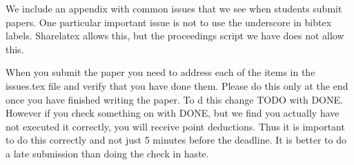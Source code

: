 
 

\appendix

We include an appendix with common issues that we see when students
submit papers. One particular important issue is not to use the
underscore in bibtex labels. Sharelatex allows this, but the
proceedings script we have does not allow this.

When you submit the paper you need to address each of the items in the
issues.tex file and verify that you have done them. Please do this
only at the end once you have finished writing the paper. To d this
change TODO with DONE. However if you check something on with DONE, but
we find you actually have not executed it correctly, you will receive
point deductions. Thus it is important to do this correctly and not
just 5 minutes before the deadline. It is better to do a late
submission than doing the check in haste. 



